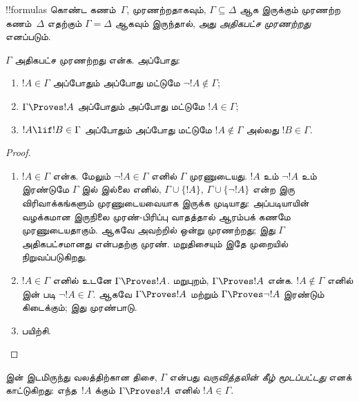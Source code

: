 \documentclass[11pt,a4paper,openany]{memoir}
\begin{document}
\begin{defn}
!!{formula}s கொண்ட கணம்~$\Gamma$, முரணற்றதாகவும்,
$\Gamma \subseteq \Delta$ ஆக இருக்கும் முரணற்ற
கணம்~$\Delta$ எதற்கும் $\Gamma = \Delta$ ஆகவும்
இருந்தால், அது \emph{அதிகபட்ச முரணற்றது} எனப்படும்.
\end{defn}

\begin{lem}[மெய்மைத் துணைத்தேற்றம்]
$\Gamma$ அதிகபட்ச முரணற்றது என்க. அப்போது:
\begin{enumerate}
\item {} $!A \in \Gamma$ அப்போதும்
  அப்போது மட்டுமே $\lnot !A \notin \Gamma$;
\item {} $\Gamma \Proves !A$ அப்போதும்
  அப்போது மட்டுமே $!A \in \Gamma$;
\item {} $!A \lif !B \in \Gamma$
  அப்போதும் அப்போது மட்டுமே $!A \notin \Gamma$
  அல்லது $!B \in \Gamma$.
\end{enumerate}
\end{lem}

\begin{proof}
\begin{enumerate}
\item $!A \in \Gamma$ என்க. மேலும் $\lnot !A \in \Gamma$
  எனில் $\Gamma$ முரணுடையது. $!A$ உம்
  $\lnot!A$ உம் இரண்டுமே $\Gamma$ இல் இல்லை எனில்,
  $\Gamma\cup\{!A\}$, $\Gamma \cup \{\lnot !A\}$
  என்ற இரு விரிவாக்கங்களும் முரணுடையவையாக இருக்க
  முடியாது: அப்படியாயின் வழக்கமான இருநிலை
  முரண்-பிரிப்பு வாதத்தால் ஆரம்பக் கணமே முரணுடையதாகும்.
  ஆகவே அவற்றில் ஒன்று முரணற்றது; இது $\Gamma$
  அதிகபட்சமானது என்பதற்கு முரண். மறுதிசையும்
  இதே முறையில் நிறுவப்படுகிறது.

\item $!A \in \Gamma$ எனில் உடனே
  $\Gamma \Proves !A$. மறுபுறம், $\Gamma \Proves !A$
  என்க. $!A \notin \Gamma$ எனில்
   இன் படி $\lnot !A \in \Gamma$.
  ஆகவே $\Gamma \Proves !A$ மற்றும்
  $\Gamma \Proves \lnot !A$ இரண்டும் கிடைக்கும்;
  இது முரண்பாடு.
\item பயிற்சி.
\end{enumerate}
\end{proof}

 இன் இடமிருந்து
வலத்திற்கான திசை, $\Gamma$ என்பது
\emph{வருவித்தலின் கீழ் மூடப்பட்டது} எனக் காட்டுகிறது:
எந்த~$!A$ க்கும் $\Gamma \Proves !A$ எனில்
$!A \in \Gamma$.
\end{document}
